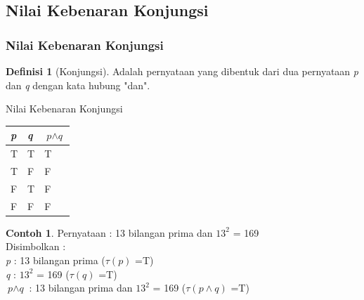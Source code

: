 \documentclass[handout]{beamer}
\theoremstyle{definition}
\newtheorem{definisi}[theorem]{Definisi}
\theoremstyle{example}
\newtheorem{contoh}[theorem]{Contoh}
\begin{document}
\subsection{Nilai Kebenaran Konjungsi}
\begin{frame}[shrink]
\frametitle{Nilai Kebenaran Konjungsi}
   \begin{definisi}[Konjungsi]
   	Adalah pernyataan yang dibentuk dari dua pernyataan \textit{p} dan \textit{q} dengan kata hubung "dan".   	
   \end{definisi}
    \begin{block}{Nilai Kebenaran Konjungsi}
    	\begin{tabular}{ | l | l | l | }
    		\hline
    		\textit{p} & \textit{q} & $\textit{p}\wedge\textit{q}$ \\ \hline
    		T & T & T \\ \hline
    		T & F & F \\ \hline
    		F & T & F \\ \hline
    		F & F & F \\     		 
    		\hline
    	\end{tabular}
    \end{block}
    \begin{contoh}
        Pernyataan : 13 bilangan prima dan $13^2$ = 169 \\
        Disimbolkan :\\
        \textit{p} : 13 bilangan prima ($\tau(\textit{p})$ =T)\\
        \textit{q} : $13^2$ = 169 ($\tau(\textit{q})$ =T)\\
        $\textit{p}\wedge\textit{q}$ : 13 bilangan prima dan $13^2$ = 169 ($\tau(\textit{p}\wedge\textit{q})$ =T)
    \end{contoh}
    
\end{frame}
\end{document}
